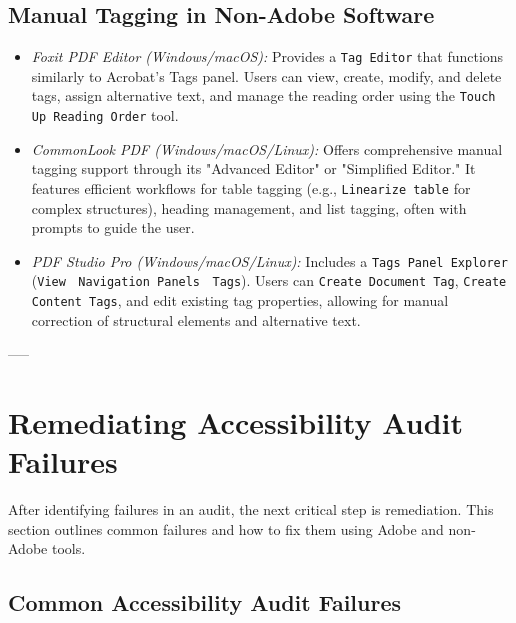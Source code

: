\begin{itemize}
\subsection{Manual Tagging in Non-Adobe Software}
\label{subsec:manual-tagging-non-adobe}
\begin{itemize}
\item \emph{Foxit PDF Editor (Windows/macOS):} Provides a \texttt{Tag Editor} that functions similarly to Acrobat's Tags panel. Users can view, create, modify, and delete tags, assign alternative text, and manage the reading order using the \texttt{Touch Up Reading Order} tool.
\item \emph{CommonLook PDF (Windows/macOS/Linux):} Offers comprehensive manual tagging support through its "Advanced Editor" or "Simplified Editor." It features efficient workflows for table tagging (e.g., \texttt{Linearize table} for complex structures), heading management, and list tagging, often with prompts to guide the user.
\item \emph{PDF Studio Pro (Windows/macOS/Linux):} Includes a \texttt{Tags Panel Explorer} (\texttt{View} $\>$ \texttt{Navigation Panels} $\>$ \texttt{Tags}). Users can \texttt{Create Document Tag}, \texttt{Create Content Tags}, and edit existing tag properties, allowing for manual correction of structural elements and alternative text.
\end{itemize}

-----

\section{Remediating Accessibility Audit Failures}
\label{sec:remediation}
After identifying failures in an audit, the next critical step is remediation. This section outlines common failures and how to fix them using Adobe and non-Adobe tools.

\subsection{Common Accessibility Audit Failures}
\label{subsec:common-failures}


\end{itemize}

